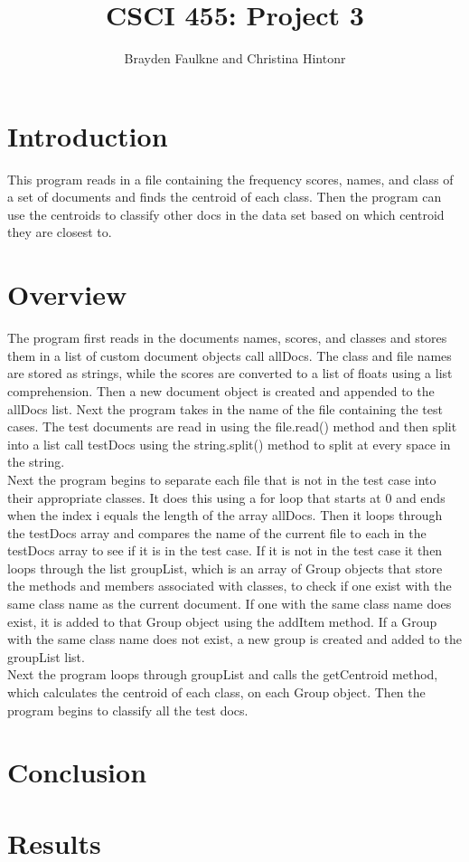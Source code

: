 \documentclass[12pt]{article}
\author{Brayden Faulkne and Christina Hintonr}
\title{CSCI 455: Project 3}
\begin{document}
\maketitle
\section{Introduction}
\indent This program reads in a file containing the frequency scores, names, and class of a set of documents and finds the centroid of each class. Then the program can use the centroids to classify other docs in the data set based on which centroid they are closest to. 
\section{Overview}
\indent The program first reads in the documents names, scores, and classes and stores them in a list of custom document objects call allDocs. The class and file names are stored as strings, while the scores are converted to a list of floats using a list comprehension. Then a new document object is created and appended to the allDocs list. Next the program takes in the name of the file containing the test cases. The test documents are read in using the file.read() method and then split into a list call testDocs using the string.split() method to split at every space in the string. \\
\indent Next the program begins to separate each file that is not in the test case into their appropriate classes. It does this using a for loop that starts at 0 and ends when the index i equals the length of the array allDocs. Then it loops through the testDocs array and compares the name of the current file to each in the testDocs array to see if it is in the test case. If it is not in the test case it then loops through the list groupList, which is an array of Group objects that store the methods and members associated with classes, to check if one exist with the same class name as the current document. If one with the same class name does exist, it is added to that Group object using the addItem method. If a Group with the same class name does not exist, a new group is created and added to the groupList list. \\
\indent Next the program loops through groupList and calls the getCentroid method, which calculates the centroid of each class, on each Group object. Then the program begins to classify all the test docs. 

\section{Conclusion} 

\section{Results}


\begin{thebibliography}{9}


\end{thebibliography}
\end{document}
